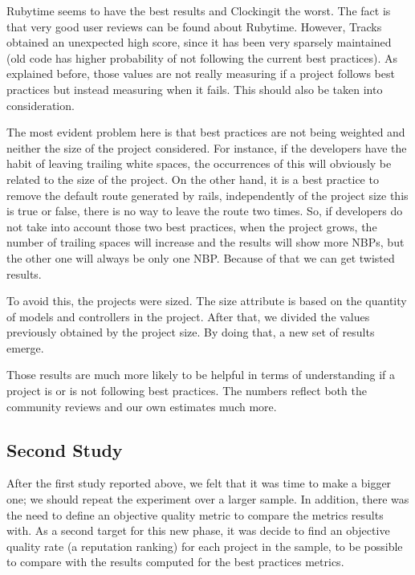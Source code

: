 

Rubytime seems to have the best results and Clockingit the worst. 
The fact is that very good user reviews can be found about Rubytime.
However, Tracks obtained an unexpected high score, since it has been very sparsely maintained 
(old code has higher probability of not following the current best practices).
As explained before, those values are not really measuring if a project follows best practices 
but instead measuring when it fails.
This should also be taken into consideration. 

The most evident problem here is that best practices are not being weighted and neither the size of the project considered.
For instance, if the developers have the habit of leaving trailing white spaces, 
the occurrences of this will obviously be related to the size of the project.
On the other hand, it is a best practice to remove the default route generated by rails, 
independently of the project size this is true or false, there is no way to leave the route two times. 
So, if developers do not take into account those two best practices, when the project grows, 
the number of trailing spaces will increase and the results will show more NBPs, 
but the other one will always be only one NBP.  
Because of that we can get twisted results.

To avoid this, the projects were sized.
The size attribute is based on the quantity of models and controllers in the project.
After that, we divided the values previously obtained  by the project size.
By doing that, a new set of results emerge.



Those results are much more likely to be helpful in terms of understanding if a project is or is not following 
best practices.
The numbers reflect both the community reviews and our own estimates much more.


\subsection{Second Study}\label{subsec:second_study}
After the first study reported above, we felt that it was time to make a bigger one;
we should repeat the experiment over a larger sample. 
In addition, there was the need to define an objective quality metric to compare the metrics results with.
As a second target for this new phase, it was decide to find an objective quality rate (a reputation ranking) for each project in the sample, 
to be possible to compare with the results computed for the best practices metrics.

